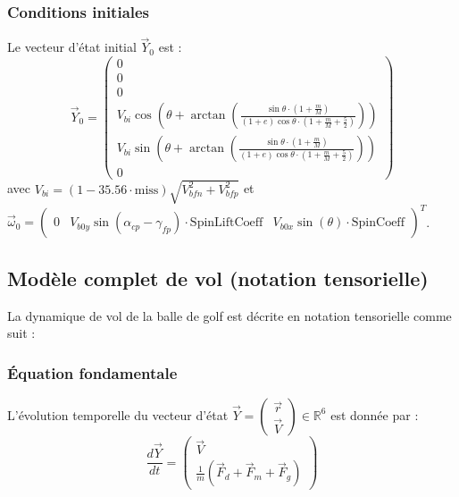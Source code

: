 \documentclass[10pt,a4paper]{report}
\begin{document}
\subsubsection{Conditions initiales}
Le vecteur d'état initial $\vec{Y}_0$ est :
\begin{equation}
    \vec{Y}_0 = \begin{pmatrix}
    0 \\
    0 \\
    0 \\
    V_{bi} \cos\left( \theta + \arctan\left( \frac{\sin \theta \cdot (1 + \frac{m}{M})}{(1 + e) \cos \theta \cdot (1 + \frac{m}{M} + \frac{5}{2})} \right) \right) \\
    V_{bi} \sin\left( \theta + \arctan\left( \frac{\sin \theta \cdot (1 + \frac{m}{M})}{(1 + e) \cos \theta \cdot (1 + \frac{m}{M} + \frac{5}{2})} \right) \right) \\
    0
    \end{pmatrix}
    \label{eq:initial_conditions}
\end{equation}
avec $V_{bi} = (1 - 35.56 \cdot \text{miss}) \sqrt{V_{bfn}^2 + V_{bfp}^2}$ et $\vec{\omega}_0 = \begin{pmatrix} 0 & V_{b0y} \sin(\alpha_{cp} - \gamma_{fp}) \cdot \text{SpinLiftCoeff} & V_{b0x} \sin(\theta) \cdot \text{SpinCoeff} \end{pmatrix}^T$.

\subsection{Modèle complet de vol (notation tensorielle)}
La dynamique de vol de la balle de golf est décrite en notation tensorielle comme suit :

\subsubsection{Équation fondamentale}
L'évolution temporelle du vecteur d'état $\vec{Y} = \begin{pmatrix} \vec{r} \\ \vec{V} \end{pmatrix} \in \mathbb{R}^6$ est donnée par :
\begin{equation}
    \frac{d\vec{Y}}{dt} = \begin{pmatrix}
    \vec{V} \\
    \frac{1}{m} \left( \vec{F}_d + \vec{F}_m + \vec{F}_g \right)
    \end{pmatrix}
    \label{eq:tensor_ode}
\end{equation}
\end{document}
